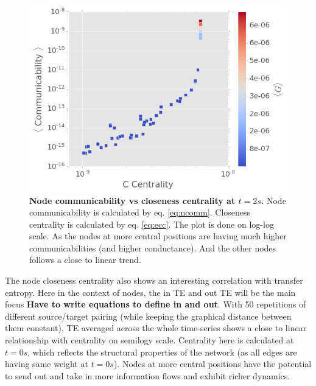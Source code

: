 \documentclass[%
 reprint,
 amsmath,amssymb,
 aps,
]{revtex4-2}
\begin{document}


\begin{figure}[h]
	\centering
	\includegraphics[width=1\linewidth]{figure/comm_cent}
	\caption{\textbf{Node communicability vs closeness centrality at $t = 2 s$.} Node communicability is calculated by eq. \ref{eq:ncomm}. Closeness centrality is calculated by eq. \ref{eq:ecc}. The plot is done on log-log scale. As the nodes at more central positions are having much higher communicabilities (and higher conductance). And the other nodes follows a close to linear trend.}
	\label{fig:comm_cent}
\end{figure}

The node closeness centrality also shows an interesting correlation with transfer entropy. Here in the context of nodes, the in TE and out TE will be the main focus \textbf{Have to write equations to define in and out}. With 50 repetitions of different source/target pairing (while keeping the graphical distance between them constant), TE averaged across the whole time-series shows a close to linear relationship with centrality on semilogy scale. Centrality here is calculated at $t = 0s$, which reflects the structural properties of the network (as all edges are having same weight at $t = 0s$). Nodes at more central positions have the potential to send out and take in more information flows and exhibit richer dynamics.
\end{document}

